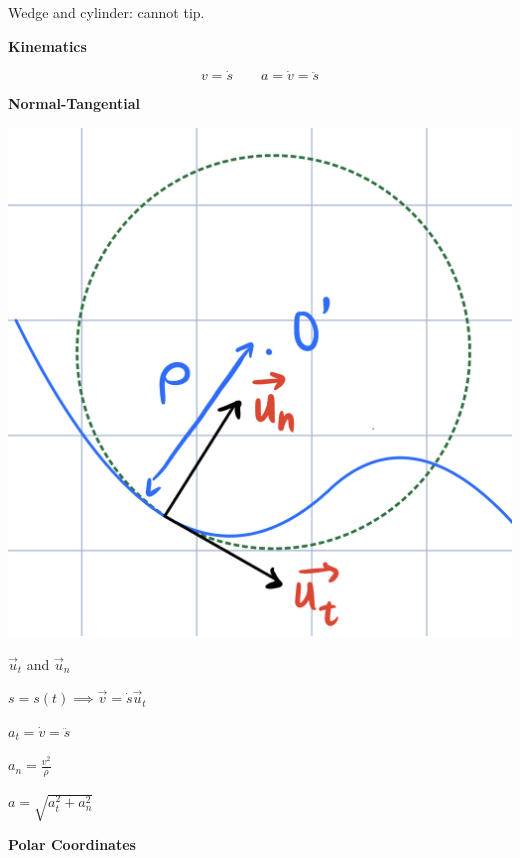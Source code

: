 \documentclass[10pt]{article}
\newcommand\sectionheading[1]{\begin{center}\large{\textbf{#1}}\end{center}\normalsize}
\newcommand\heading[1]{\medskip\textbf{#1}\medskip}
\begin{document}
\begin{multicols*}{3}
Wedge and cylinder: cannot tip.

\sectionheading{Kinematics}
\[v=\dot{s} \qquad a=\dot{v}=\ddot{s}\]

\heading{Normal-Tangential}

\begin{multicols}{2}
    \begin{center}
        \includegraphics[scale=0.05]{images/normal_tangential.jpg}
    \end{center}

    $\vec{u}_t$ and $\vec{u}_n$

    $s=s(t)\implies\vec{v}=\dot{s}\vec{u}_t$

    $a_t=\dot{v}=\ddot{s}$

    $a_n=\frac{v^2}{\rho}$

    $a=\sqrt{a_t^2+a_n^2}$
\end{multicols}

\newcolumn 

\heading{Polar Coordinates}


\end{multicols*}
\end{document}
